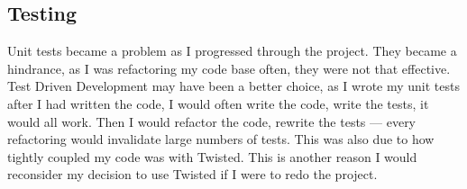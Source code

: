 \documentclass[12pt,twoside,notitlepage]{report}
\begin{document}
%
%
%
%
%

\subsection*{Testing}

Unit tests became a problem as I progressed through the project. They became a hindrance, as I
was refactoring my code base often, they were not that effective. Test Driven Development may have
been a better choice, as I wrote my unit tests after I had written the code, I would often write
the code, write the tests, it would all work. Then I would refactor the code, rewrite the tests ---
every refactoring would invalidate large numbers of tests. This was also due to how tightly
coupled my code was with Twisted. This is another reason I would reconsider my decision to use
Twisted if I were to redo the project.
\end{document}
